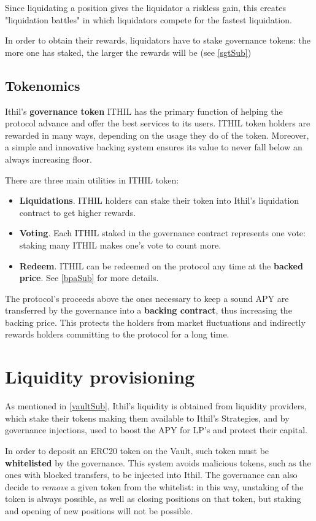 \documentclass[a4paper,10 pt]{article}
\theoremstyle{definition}
\begin{document}
Since liquidating a position gives the liquidator a riskless gain, this creates "liquidation battles" in which liquidators compete for the fastest liquidation.

In order to obtain their rewards, liquidators have to stake governance tokens: the more one has staked, the larger the rewards will be (see \ref{sgtSub})

\subsection{Tokenomics}\label{tokSub}

Ithil's {\bf governance token} ITHIL has the primary function of helping the protocol advance and offer the best services to its users. ITHIL token holders are rewarded in many ways, depending on the usage they do of the token. Moreover, a simple and innovative backing system ensures its value to never fall below an always increasing floor.

There are three main utilities in ITHIL token:
\begin{itemize}
\item {\bf Liquidations}. ITHIL holders can stake their token into Ithil's liquidation contract to get higher rewards.
\item {\bf Voting}. Each ITHIL staked in the governance contract represents one vote: staking many ITHIL makes one's vote to count more.
\item {\bf Redeem}. ITHIL can be redeemed on the protocol any time at the {\bf backed price}. See \ref{bpaSub} for more details. 
\end{itemize}
The protocol's proceeds above the ones necessary to keep a sound APY are transferred by the governance into a {\bf backing contract}, thus increasing the backing price. This protects the holders from market fluctuations and indirectly rewards holders committing to the protocol for a long time.

\section{Liquidity provisioning}\label{liquidityProvSec}

As mentioned in \ref{vaultSub}, Ithil's liquidity is obtained from liquidity providers, which stake their tokens making them available to Ithil's Strategies, and by governance injections, used to boost the APY for LP's and protect their capital.

In order to deposit an ERC20 token on the Vault, such token must be {\bf whitelisted} by the governance. This system avoids malicious tokens, such as the ones with blocked transfers, to be injected into Ithil. The governance can also decide to {\it remove} a given token from the whitelist: in this way, unstaking of the token is always possible, as well as closing positions on that token, but staking and opening of new positions will not be possible.
\end{document}

